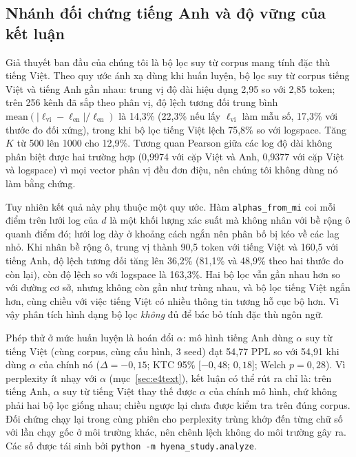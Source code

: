 \documentclass[11pt]{article}
\begin{document}
\subsection{Nhánh đối chứng tiếng Anh và độ vững của kết luận}
\label{sec:doichung}

Giả thuyết ban đầu của chúng tôi là bộ lọc suy từ corpus mang tính đặc thù tiếng
Việt. Theo quy ước ánh xạ dùng khi huấn luyện, bộ lọc suy từ corpus tiếng Việt
và tiếng Anh gần nhau: trung vị độ dài hiệu dụng 2,95 so với 2,85 token; trên 256
kênh đã sắp theo phân vị, độ lệch tương đối trung bình
$\mathrm{mean}(|\ell_{\text{vi}}-\ell_{\text{en}}|/\ell_{\text{en}})$ là 14,3\%
(22,3\% nếu lấy $\ell_{\text{vi}}$ làm mẫu số, 17,3\% với thước đo đối xứng),
trong khi bộ lọc tiếng Việt lệch 75,8\% so với \textsf{logspace}. Tăng $K$ từ
500 lên 1000 cho 12,9\%. Tương quan Pearson giữa các log độ dài không phân biệt
được hai trường hợp (0,9974 với cặp Việt và Anh, 0,9377 với cặp Việt và
\textsf{logspace}) vì mọi vector phân vị đều đơn điệu, nên chúng tôi không dùng
nó làm bằng chứng.

Tuy nhiên kết quả này phụ thuộc một quy ước. Hàm \texttt{alphas\_from\_mi} coi
mỗi điểm trên lưới log của $d$ là một khối lượng xác suất mà không nhân với bề
rộng ô quanh điểm đó; lưới log dày ở khoảng cách ngắn nên phân bố bị kéo về các
lag nhỏ. Khi nhân bề rộng ô, trung vị thành 90,5 token với tiếng Việt và 160,5
với tiếng Anh, độ lệch tương đối tăng lên 36,2\% (81,1\% và 48,9\% theo hai
thước đo còn lại), còn độ lệch so với \textsf{logspace} là 163,3\%. Hai bộ lọc
vẫn gần nhau hơn so với đường cơ sở, nhưng không còn gần như trùng nhau, và bộ
lọc tiếng Việt ngắn hơn, cùng chiều với việc tiếng Việt có nhiều thông tin tương
hỗ cục bộ hơn. Vì vậy phân tích hình dạng bộ lọc \emph{không} đủ để bác bỏ tính
đặc thù ngôn ngữ.

Phép thử ở mức huấn luyện là hoán đổi $\alpha$: mô hình tiếng Anh dùng $\alpha$
suy từ tiếng Việt (cùng corpus, cùng cấu hình, 3 seed) đạt 54,77 PPL so với 54,91
khi dùng $\alpha$ của chính nó ($\Delta = -0{,}15$; KTC 95\% [$-0{,}48$; $0{,}18$];
Welch $p = 0{,}28$). Vì perplexity ít nhạy với $\alpha$ (mục~\ref{sec:e4text}),
kết luận có thể rút ra chỉ là: trên tiếng Anh, $\alpha$ suy từ tiếng Việt thay thế
được $\alpha$ của chính mô hình, chứ không phải hai bộ lọc giống nhau; chiều ngược
lại chưa được kiểm tra trên đúng corpus. Đối chứng chạy lại trong cùng phiên cho
perplexity trùng khớp đến từng chữ số với lần chạy gốc ở môi trường khác, nên
chênh lệch không do môi trường gây ra. Các số được tái sinh bởi \texttt{python -m hyena\_study.analyze}.
\end{document}
